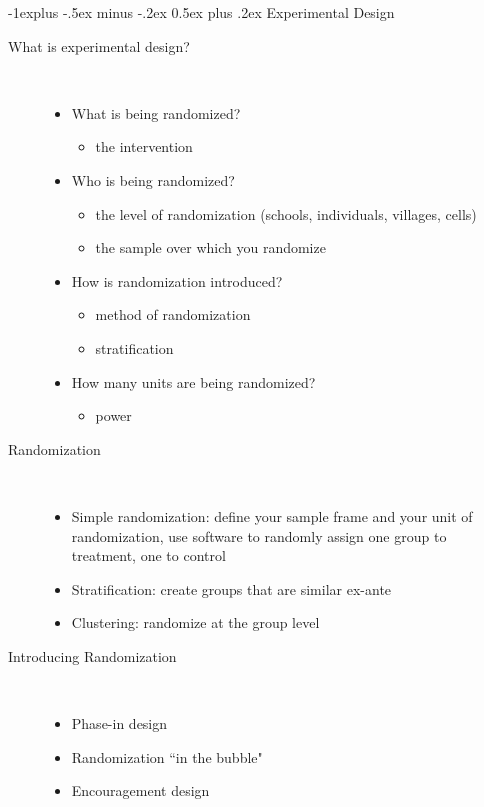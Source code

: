 \documentclass[a4paper,10pt,landscape]{article}
\makeatletter
\renewcommand{\subsection}{\@startsection{subsection}{2}{0mm}%
                                {-1explus -.5ex minus -.2ex}%
                                {0.5ex plus .2ex}%
                                {\normalfont\normalsize\bfseries}}
\makeatother
\begin{document}
\begin{multicols*}{3}
\subsection{Experimental Design}
\begin{description}
	\item[What is experimental design?] ~
	\begin{itemize}[noitemsep,topsep=0pt]
		\item  What is being randomized?
		\begin{itemize}[noitemsep,topsep=0pt]
			\item the intervention
		\end{itemize}
		\item Who is being randomized?
		\begin{itemize}[noitemsep,topsep=0pt]
			\item the level of randomization (schools, individuals, villages, cells)
			\item the sample over which you randomize
		\end{itemize}
		\item How is randomization introduced?
		\begin{itemize}[noitemsep,topsep=0pt]
			\item method of randomization
			\item stratification
		\end{itemize}
		\item How many units are being randomized?
		\begin{itemize}[noitemsep,topsep=0pt]
			\item power
		\end{itemize}
	\end{itemize}
	\item[Randomization] ~
	\begin{itemize}[noitemsep,topsep=0pt]
		\item Simple randomization: define your sample frame and your unit of randomization, use software to randomly assign one group to treatment, one to control
		\item Stratification: create groups that are similar ex-ante
		\item Clustering: randomize at the group level
	\end{itemize}
\item[Introducing Randomization] ~
\begin{itemize}[noitemsep,topsep=0pt]
	\item Phase-in design
	\item Randomization ``in the bubble"
	\item Encouragement design
\end{itemize}
\end{description}


\end{multicols*}
\end{document}
